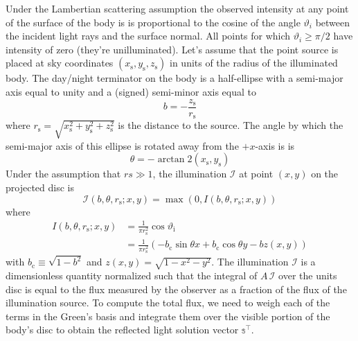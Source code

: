 \documentclass[12pt,dvipsnames]{report}
\begin{document}
Under the Lambertian scattering assumption the observed intensity at any point
of the surface of the body is is proportional to the cosine of the angle
$\vartheta_i$ between the incident light rays and the surface normal. All
points for which $\vartheta_i\geq \pi/2$ have intensity of zero (they're
unilluminated). Let's assume that the point source is placed at sky coordinates
$\left(x_{\mathrm{s}}, y_{\mathrm{s}}, z_{\mathrm{s}}\right)$ in units of the
radius of the illuminated body. The day/night terminator on the body is a
half-ellipse with a semi-major axis equal to unity and a (signed) semi-minor
axis equal to
\begin{equation}
    b=-\frac{z_{\mathrm{s}}}{r_{\mathrm{s}}}
\end{equation}
where $r_{\mathrm{s}}=\sqrt{x_{\mathrm{s}}^{2}+y_{\mathrm{s}}^{2}+z_{\mathrm{s}}^{2}}$
is the distance to the source. The angle by which the semi-major axis of this ellipse is
rotated away from the $+x$-axis is  is
\begin{equation}
    \theta=-\arctan 2\left(x_{\mathrm{s}}, y_{\mathrm{s}}\right)
\end{equation}
Under the assumption that $rs \gg 1$, the illumination $\mathcal{I}$ at point
$(x,y)$ on the projected disc is \citep{2021arXiv210306275L}
\begin{equation}
    \mathcal{I}\left(b, \theta, r_{\mathrm{s}} ; x, y\right)=\max \left(0, I\left(b, \theta, r_{\mathrm{s}} ; x, y\right)\right)
    \label{eq:illumination}
\end{equation}
where
\begin{align}
    I\left(b, \theta, r_{\mathrm{s}} ; x, y\right) & =\frac{1}{\pi r_{\mathrm{s}}^{2}} \cos \vartheta_{\mathrm{i}}                                                      \\
                                                   & =\frac{1}{\pi r_{\mathrm{s}}^{2}}\left(-b_{\mathrm{c}} \sin \theta x+b_{\mathrm{c}} \cos \theta y-b z(x, y)\right)
\end{align}
with  $b_{\mathrm{c}} \equiv \sqrt{1-b^{2}}$  and $z(x, y)=\sqrt{1-x^{2}-y^{2}}$.
The illumination $\mathcal{I}$ is a dimensionless quantity normalized such that the
integral of $A\,\mathcal{I}$ over the units disc is equal to the flux measured by the
observer as a fraction of the flux of the illumination source.
To compute the total flux, we need to weigh each of the terms in the Green's basis
and integrate them over the visible portion of the body's disc to obtain
the reflected light solution vector $\mathbb{s}^\intercal$.
\end{document}
